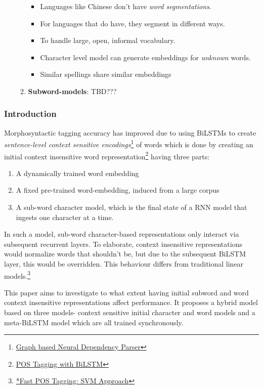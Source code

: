\documentclass[11pt]{article}
\begin{document}
\begin{enumerate}
\begin{enumerate}
\begin{itemize}
\item Languages like Chinese don't have \emph{word segmentations}.
\item For languages that do have, they segment in different ways.
\item To handle large, open, informal vocabulary.
\item Character level model can generate embeddings for \emph{unknown} words.
\item Similar spellings share similar embeddings
\end{itemize}
\item \textbf{Subword-models}: TBD???
\end{enumerate}
\end{enumerate}
\subsubsection{Introduction}
\label{sec:org20c5528}
Morphosyntactic tagging accuracy has improved due to using BiLSTMs to create \emph{sentence-level context sensitive encodings}\footnote{\href{https://www.aclweb.org/anthology/K17-3002.pdf}{Graph based Neural Dependency Parser}\label{org631a0bd}} of words which is done by creating an initial context insensitive word representation\footnote{\href{https://arxiv.org/pdf/1604.05529.pdf}{POS Tagging with BiLSTM}\label{org5aeba47}} having three parts:
\begin{enumerate}
\item A dynamically trained word embedding
\item A fixed pre-trained word-embedding, induced from a large corpus
\item A sub-word character model, which is the final state of a RNN model that ingests one character at a time.
\end{enumerate}
In such a model, sub-word character-based representations only interact via subsequent recurrent layers. To elaborate, context insensitive representations would normalize words that shouldn't be, but due to the subsequent BiLSTM layer, this would be overridden. This behaviour differs from traditional linear models.\footnote{\href{http://citeseerx.ist.psu.edu/viewdoc/download;jsessionid=40AFFD632AC50016FE3B435B5C3FD50F?doi=10.1.1.4.7273\&rep=rep1\&type=pdf}{*Fast POS Tagging: SVM Approach}\label{orga215ed2}}

This paper aims to investigate to what extent having initial subword and word context insensitive representations affect performance. It proposes a hybrid model based on three models- context sensitive initial character and word models and a meta-BiLSTM model which are all trained synchronously.
\end{document}
